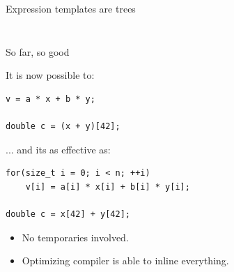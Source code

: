 \documentclass[@BEAMER_OPTIONS@]{beamer}
\newcommand{\code}[1]{\lstinline|#1|}
\begin{document}
\begin{frame}[fragile]{Expression templates are trees}
\begin{columns}
\begin{column}{0.45\textwidth}
\begin{figure}
            \end{figure}
        \end{column}
    \end{columns}
\end{frame}

\note{ }

\begin{frame}[fragile]{So far, so good}
    \begin{exampleblock}{It is now possible to:}
        \begin{lstlisting}
v = a * x + b * y;

double c = (x + y)[42];
        \end{lstlisting}
    \end{exampleblock}

    \begin{exampleblock}{... and its as effective as:}
        \begin{lstlisting}
for(size_t i = 0; i < n; ++i)
    v[i] = a[i] * x[i] + b[i] * y[i];

double c = x[42] + y[42];
        \end{lstlisting}
    \end{exampleblock}
    \begin{itemize}
        \item No temporaries involved.
        \item Optimizing compiler is able to inline everything.
    \end{itemize}
\end{frame}
\end{document}
